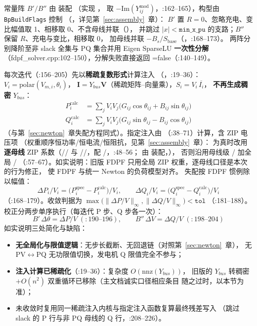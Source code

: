 常量阵 $B'/B''$ 由  装配
（实现 ，
取 $-\mathrm{Im}(Y^{\mathrm{mod}}_{ij})$，:162--165），构型由 \texttt{BpBuildFlags} 控制
（，详见第~\ref{sec:assembly}~章）：
$B'$ 置 $R=0$、忽略充电、变比幅值取 1、相移取 0、不含母线并联（），
并跳过 $|x|<\texttt{min\_x\_pu}$ 的支路；$B''$ 保留 $R$、充电与变比，相移取 0，
加母线并联 $-B_s/S_{\mathrm{base}}$（，:168--173）。
两阵分别降阶至非 slack 全集与 PQ 集合并用 Eigen SparseLU \textbf{一次性分解}
（fdpf\_solver.cpp:102--150），分解失败直接返回 =false（:140--149）。

每次迭代（:156--205）先以\textbf{稀疏复数形式}计算注入
（，:19--36）：$V_i=\mathrm{polar}(V_{m,i},\theta_i)$，
$\mathbf I=Y_{bus}\mathbf V$（稀疏矩阵--向量乘），$S_i=V_i\,\overline{I_i}$，
\textbf{不再生成稠密} $Y_{bus}$：
\begin{align*}
P_i^{\mathrm{calc}}&=\sum_{j}V_iV_j\big(G_{ij}\cos\theta_{ij}+B_{ij}\sin\theta_{ij}\big)\\
Q_i^{\mathrm{calc}}&=\sum_{j}V_iV_j\big(G_{ij}\sin\theta_{ij}-B_{ij}\cos\theta_{ij}\big)
\end{align*}
（与第~\ref{sec:newton}~章失配方程同式）。指定注入由
（:38--71）计算，含 ZIP 电压项
（权重顺序恒功率/恒电流/恒阻抗，见第~\ref{sec:assembly}~章）：
为真时改用\textbf{逐母线} ZIP 系数（// 与
//，配 /，:48--56；
由  装配，），
否则沿用母线级 / 加全局 /
（:57--67）。如实说明：旧版 FDPF 只用全局 ZIP 权重，逐母线口径是本次的行为修正，
使 FDPF 与统一 Newton 的负荷模型对齐。
失配按 FDPF 惯例除以幅值：
\[
\Delta P_i/V_i=\big(P_i^{\mathrm{spec}}-P_i^{\mathrm{calc}}\big)/V_i,\qquad
\Delta Q_i/V_i=\big(Q_i^{\mathrm{spec}}-Q_i^{\mathrm{calc}}\big)/V_i
\]
（:168--179）。收敛判据为
$\max\big(\lVert\Delta P/V\rVert_\infty,\lVert\Delta Q/V\rVert_\infty\big)<\texttt{tol}$
（:181--188）。校正分两步单序执行（每迭代 P 步、Q 步各一次）：
\[
B'\,\Delta\theta=\Delta P/V\;(:190\text{--}196),\qquad
B''\,\Delta V=\Delta Q/V\;(:198\text{--}204)
\]
如实说明三处简化与缺陷：
\begin{itemize}
  \item \textbf{无全局化与限值逻辑}：无步长截断、无回退链（对照第~\ref{sec:newton}~章），
        无 PV$\leftrightarrow$PQ 无功限值切换，发电机 Q 限值完全不参与；
  \item \textbf{注入计算已稀疏化}（:19--36）：复杂度 $O(\mathrm{nnz}(Y_{bus}))$，
        旧版的 $Y_{bus}$ 转稠密 $+O(n^2)$ 双重循环已移除（主文档诚实口径相应条目
        随之过时，以本节为准）；
  \item 未收敛时复用同一稀疏注入内核与指定注入函数复算最终残差写入 
        （跳过 slack 的 P 行与非 PQ 母线的 Q 行，:208--226）。
\end{itemize}

